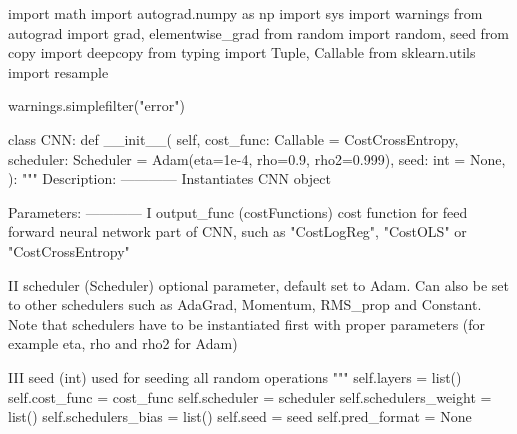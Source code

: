 \documentclass[%
oneside,                 %
final,                   %
10pt]{article}
\begin{document}
\bpycod
import math
import autograd.numpy as np
import sys
import warnings
from autograd import grad, elementwise_grad
from random import random, seed
from copy import deepcopy
from typing import Tuple, Callable
from sklearn.utils import resample

warnings.simplefilter("error")


class CNN:
    def __init__(
        self,
        cost_func: Callable = CostCrossEntropy,
        scheduler: Scheduler = Adam(eta=1e-4, rho=0.9, rho2=0.999),
        seed: int = None,
    ):
        """
        Description:
        ------------
            Instantiates CNN object

        Parameters:
        ------------
            I   output_func (costFunctions) cost function for feed forward neural network part of CNN,
                such as "CostLogReg", "CostOLS" or "CostCrossEntropy"

            II  scheduler (Scheduler) optional parameter, default set to Adam. Can also be set to other
                schedulers such as AdaGrad, Momentum, RMS_prop and Constant. Note that schedulers have
                to be instantiated first with proper parameters (for example eta, rho and rho2 for Adam)

            III seed (int) used for seeding all random operations
        """
        self.layers = list()
        self.cost_func = cost_func
        self.scheduler = scheduler
        self.schedulers_weight = list()
        self.schedulers_bias = list()
        self.seed = seed
        self.pred_format = None
\end{document}
